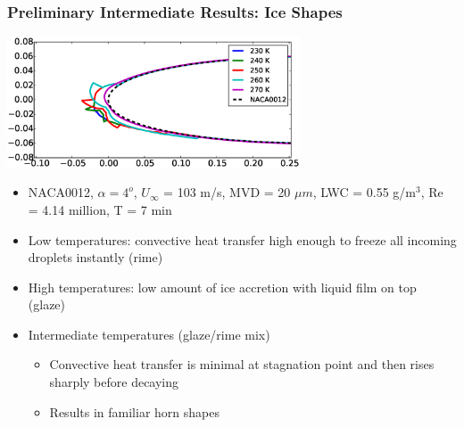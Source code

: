 \documentclass[9pt]{beamer}
\begin{document}
\begin{frame}
\frametitle{Preliminary Intermediate Results: Ice Shapes}
\label{sec-5-9}

    \centering
    \includegraphics[width=0.65\textwidth]{IceShapeTempSweep}

\begin{itemize}
\item NACA0012, $\alpha = 4^o$, $U_{\infty}$ = 103 m/s, MVD = 20 $\mu m$, LWC = 0.55 g/m$^3$, Re = 4.14 million, T = 7 min
\item Low temperatures: convective heat transfer high enough to freeze all incoming droplets instantly (rime)
\item High temperatures: low amount of ice accretion with liquid film on top (glaze)
\item Intermediate temperatures (glaze/rime mix)
\begin{itemize}
\item Convective heat transfer is minimal at stagnation point and then rises sharply before decaying
\item Results in familiar horn shapes
\end{itemize}
\end{itemize}
\end{frame}
\end{document}
